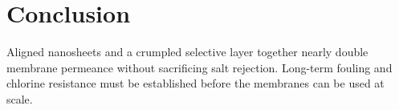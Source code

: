 \chapter{Conclusion}
\label{ch:conclusion}

Aligned nanosheets and a crumpled selective layer together nearly double membrane permeance
without sacrificing salt rejection. Long-term fouling and chlorine resistance must be
established before the membranes can be used at scale.
